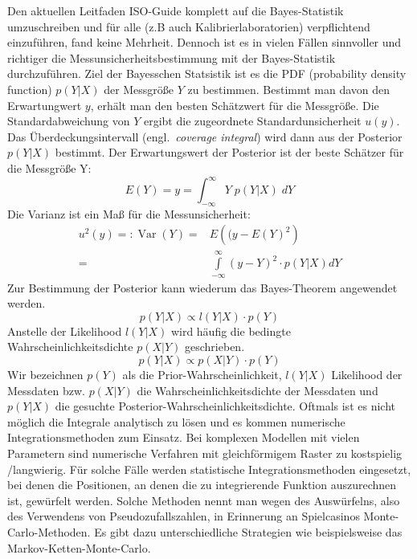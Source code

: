 Den aktuellen Leitfaden ISO-Guide komplett auf die Bayes-Statistik umzuschreiben und für alle (z.B auch Kalibrierlaboratorien) verpflichtend einzuführen, fand keine Mehrheit.
Dennoch ist es in vielen Fällen sinnvoller und richtiger die
Messunsicherheitsbestimmung mit der Bayes-Statistik durchzuführen. Ziel der Bayesschen Statsistik ist es die PDF (probability density function) $p(Y|X)$ der Messgröße $Y$
zu bestimmen. Bestimmt man davon den Erwartungwert $y$, erhält man den besten Schätzwert für die Messgröße. Die Standardabweichung von $Y$ ergibt die
zugeordnete Standardunsicherheit $u(y)$. Das Überdeckungsintervall (engl.\ \textsl{coverage integral}) wird dann aus der Posterior $p(Y|X)$ bestimmt.
Der Erwartungswert der Posterior ist der beste Schätzer für die Messgröße Y:
\[
E(Y) = y = \int_{-\infty}^{\infty} Y \; p(Y|X) \; dY
\]
Die Varianz ist ein Maß für die Messunsicherheit:
\begin{align}
u^2(y) =: \operatorname{Var}(Y) =& E \left( (y -E(Y)^2\right) \\[2ex]
 =&  \int\limits_{-\infty}^{\infty} (y-Y)^2 \cdot p(Y|X) dY
\end{align}
Zur Bestimmung der Posterior kann wiederum das Bayes-Theorem angewendet werden.
\begin{equation}
p(Y|X) \propto l(Y|X) \cdot p(Y)
\end{equation}
Anstelle der Likelihood $l(Y|X)$ wird häufig die bedingte Wahrscheinlichkeitsdichte
$p(X|Y)$ geschrieben.
\[
p(Y|X) \propto p(X|Y) \cdot p(Y)
\]
Wir bezeichnen $p(Y)$ als die Prior-Wahrscheinlichkeit,
$l(Y|X)$ Likelihood der Messdaten bzw. $p(X|Y)$ die Wahrscheinlichkeitsdichte
der Messdaten und $p(Y|X)$ die gesuchte Posterior-Wahrscheinlichkeitsdichte.
Oftmals ist es nicht möglich die Integrale analytisch zu lösen und es kommen
numerische Integrationsmethoden zum Einsatz. Bei komplexen Modellen mit vielen
Parametern sind numerische Verfahren mit gleichförmigem Raster zu kostspielig /langwierig.  Für solche Fälle werden statistische Integrationsmethoden eingesetzt, bei denen die Positionen, an denen die zu integrierende Funktion auszurechnen ist, gewürfelt werden. Solche Methoden nennt man wegen des Auswürfelns, also des Verwendens von Pseudozufallszahlen, in Erinnerung an Spielcasinos Monte-Carlo-Methoden. Es gibt dazu unterschiedliche Strategien wie beispielsweise das Markov-Ketten-Monte-Carlo.

